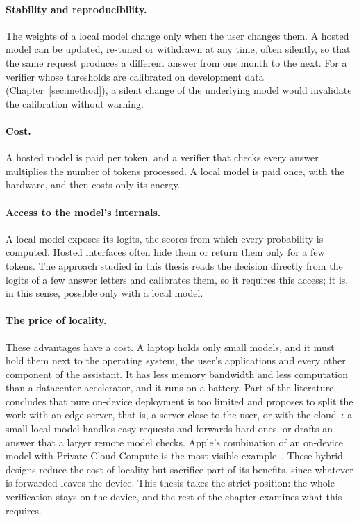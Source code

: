\paragraph{Stability and reproducibility.} The weights of a local model change only when the user changes them. A
hosted model can be updated, re-tuned or withdrawn at any time, often silently, so that the same request produces a
different answer from one month to the next. For a verifier whose thresholds are calibrated on development data
(Chapter~\ref{sec:method}), a silent change of the underlying model would invalidate the calibration without warning.

\paragraph{Cost.} A hosted model is paid per token, and a verifier that checks every answer multiplies the number of
tokens processed. A local model is paid once, with the hardware, and then costs only its energy.

\paragraph{Access to the model's internals.} A local model exposes its logits, the scores from which every probability
is computed. Hosted interfaces often hide them or return them only for a few tokens. The approach studied in this
thesis reads the decision directly from the logits of a few answer letters and calibrates them, so it requires this
access; it is, in this sense, possible only with a local model.

\paragraph{The price of locality.} These advantages have a cost. A laptop holds only small models, and it must hold them
next to the operating system, the user's applications and every other component of the assistant. It has less memory
bandwidth and less computation than a datacenter accelerator, and it runs on a battery. Part of the literature concludes
that pure on-device deployment is too limited and proposes to split the work with an edge server, that is, a server close
to the user, or with the cloud~\cite{qu2025mobileedge,li2025collaborative}: a small local model handles easy requests and
forwards hard ones, or drafts an answer that a larger remote model checks. Apple's combination of an on-device model with
Private Cloud Compute is the most visible example~\cite{gunter2024apple,apple2024pcc}. These hybrid designs reduce the
cost of locality but sacrifice part of its benefits, since whatever is forwarded leaves the device. This thesis takes the strict position:
the whole verification stays on the device, and the rest of the chapter examines what this requires.

